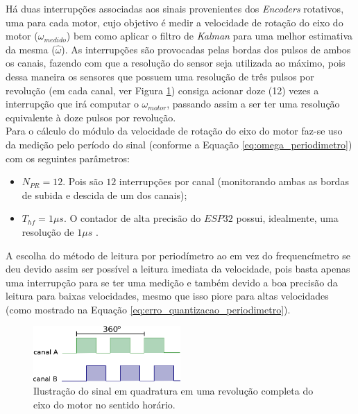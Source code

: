 Há duas interrupções associadas aos sinais provenientes dos \emph{Encoders} rotativos, uma para cada motor, cujo objetivo é medir a velocidade de rotação do eixo do motor ($\omega_{medido}$) bem como aplicar o filtro de \emph{Kalman} para uma melhor estimativa da mesma ($\hat{\omega}$). As interrupções são provocadas pelas bordas dos pulsos de ambos os canais, fazendo com que a resolução do sensor seja utilizada ao máximo, pois dessa maneira os sensores que possuem uma resolução de três pulsos por revolução (em cada canal, ver Figura \ref{fig:ilustracao_uma_revolucao}) consiga acionar doze (12) vezes a interrupção que irá computar o $\omega_{motor}$, passando assim a ser ter uma resolução equivalente à doze pulsos por revolução.\\

Para o cálculo do módulo da velocidade de rotação do eixo do motor faz-se uso da medição pelo período do sinal (conforme a Equação \ref{eq:omega_periodimetro}) com os seguintes parâmetros:

\begin{itemize}
    \item $N_{PR} = 12$. Pois são $12$ interrupções por canal (monitorando ambas as bordas de subida e descida de um dos canais);
    \item $T_{hf} = 1\mu{}s$. O contador de alta precisão do $ESP32$ possui, idealmente, uma resolução de $1\mu{}s$ \cite{esp}.
\end{itemize}

A escolha do método de leitura por periodímetro ao em vez do frequencímetro se deu devido assim ser possível a leitura imediata da velocidade, pois basta apenas uma interrupção para se ter uma medição e também devido a boa precisão da leitura para baixas velocidades, mesmo que isso piore para altas velocidades (como mostrado na Equação \ref{eq:erro_quantizacao_periodimetro}).

\begin{figure}[H]
    \centering
    \includegraphics[width=0.5\textwidth]{figuras/ilustracoes/sinal_enquadratura_uma_revolucao.eps}
    \caption{Ilustração do sinal em quadratura em uma revolução completa do eixo do motor no sentido horário.}
    \label{fig:ilustracao_uma_revolucao}
\end{figure}

